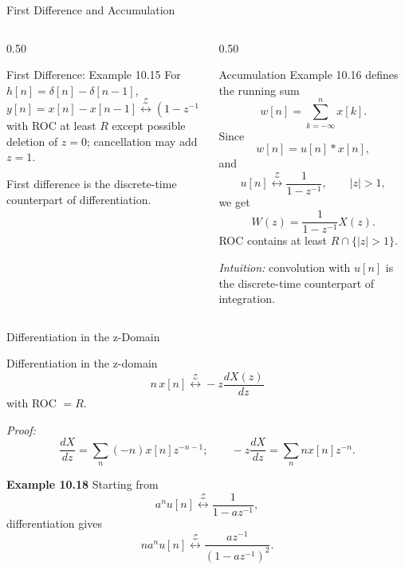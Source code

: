 \begin{frame}[t]{First Difference and Accumulation}
  \footnotesize
  \begin{columns}[T]
    \begin{column}{0.50\textwidth}
      \begin{conceptbox}{First Difference: Example 10.15}
        For $h[n]=\delta[n]-\delta[n-1]$,
        \[
          y[n]=x[n]-x[n-1]
          \stackrel{\mathcal{Z}}{\longleftrightarrow}
          (1-z^{-1})X(z),
        \]
        with ROC at least $R$ except possible deletion of $z=0$; cancellation may add $z=1$.
      \end{conceptbox}
      First difference is the discrete-time counterpart of differentiation.
    \end{column}
    \begin{column}{0.50\textwidth}
      \begin{conceptbox}{Accumulation}
        Example 10.16 defines the running sum
        \[
          w[n]=\sum_{k=-\infty}^{n}x[k].
        \]
        Since
        \[
          w[n]=u[n]*x[n],
        \]
        and
        \[
          u[n]
          \stackrel{\mathcal{Z}}{\longleftrightarrow}
          \frac{1}{1-z^{-1}},
          \qquad |z|>1,
        \]
        we get
        \[
          W(z)=\frac{1}{1-z^{-1}}X(z).
        \]
        ROC contains at least $R\cap\{|z|>1\}$.
      \end{conceptbox}
      \textit{Intuition:}
      convolution with $u[n]$ is the discrete-time counterpart of integration.
    \end{column}
  \end{columns}
\end{frame}

\begin{frame}[t]{Differentiation in the z-Domain}
  \footnotesize
  \begin{conceptbox}{Differentiation in the z-domain}
    \[
      n\,x[n]
      \stackrel{\mathcal{Z}}{\longleftrightarrow}
      -z\frac{dX(z)}{dz}
    \]
    with ROC $=R$.
  \end{conceptbox}

  \textit{Proof:}
  \[
    \frac{dX}{dz}
    =\sum_n (-n)x[n]z^{-n-1};
    \qquad -z\frac{dX}{dz}=\sum_n n x[n]z^{-n}.
  \]

  \textbf{Example 10.18}
  Starting from
  \[
    a^n u[n]
    \stackrel{\mathcal{Z}}{\longleftrightarrow}
    \frac{1}{1-az^{-1}},
  \]
  differentiation gives
  \[
    n a^n u[n]
    \stackrel{\mathcal{Z}}{\longleftrightarrow}
    \frac{az^{-1}}{(1-az^{-1})^2}.
  \]
\end{frame}

